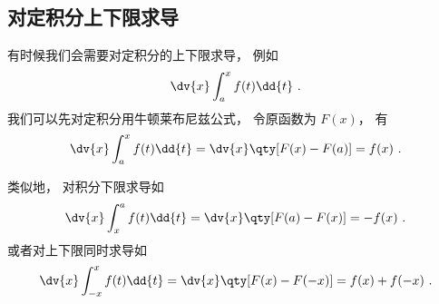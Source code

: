 \subsection{对定积分上下限求导}
有时候我们会需要对定积分的上下限求导， 例如
\begin{equation}
\dv{x} \int_a^x f(t) \dd{t}~.
\end{equation}
我们可以先对定积分用牛顿莱布尼兹公式， 令原函数为 $F(x)$， 有
\begin{equation}\label{eq_NLeib_10}
\dv{x} \int_a^x f(t) \dd{t} = \dv{x} \qty[F(x) - F(a)] = f(x)~.
\end{equation}

类似地， 对积分下限求导如
\begin{equation}
\dv{x} \int_x^a f(t) \dd{t} = \dv{x} \qty[F(a) - F(x)] = -f(x)~.
\end{equation}
或者对上下限同时求导如
\begin{equation}
\dv{x} \int_{-x}^{x} f(t) \dd{t} = \dv{x} \qty[F(x) - F(-x)] = f(x) + f(-x)~.
\end{equation}

